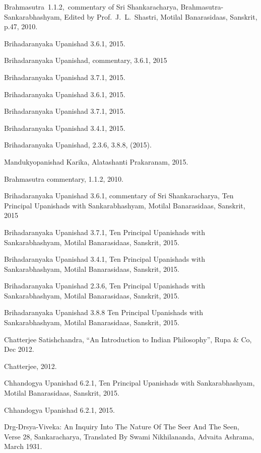 \documentclass[twoside, 13pt]{article}
\begin{document}
{{{\begin{thebibliography}{99}

\bibitem{} Brahmasutra~1.1.2,~commentary of Sri Shankaracharya, Brahmasutra-Sankarabha\break shyam, Edited by Prof.~J.~L.~Shastri, Motilal Banarasidaas, Sanskrit, p.47, 2010.

\bibitem{} Brihadaranyaka Upanishad 3.6.1, 2015.

\bibitem{} Brihadaranyaka Upanishad, commentary, 3.6.1, 2015

\bibitem{} Brihadaranyaka Upanishad 3.7.1, 2015.

\bibitem{} Brihadaranyaka Upanishad 3.6.1, 2015.

\bibitem{} Brihadaranyaka Upanishad 3.7.1, 2015.

\bibitem{} Brihadaranyaka Upanishad 3.4.1, 2015.

\bibitem{} Brihadaranyaka Upanishad, 2.3.6, 3.8.8, (2015).

\bibitem{} Mandukyopanishad Karika, Alatashanti Prakaranam, 2015.

\bibitem{} Brahmasutra commentary, 1.1.2, 2010.

\bibitem{} Brihadaranyaka Upanishad 3.6.1, commentary of Sri Shankaracharya, Ten Principal Upanishads with Sankarabhashyam, Motilal Banarasidaas, Sanskrit, 2015

\bibitem{}Brihadaranyaka Upanishad 3.7.1, Ten Principal Upanishads with Sankarabhashyam, Motilal Banarasidaas, Sanskrit, 2015.

\bibitem{} Brihadaranyaka Upanishad 3.4.1, Ten Principal Upanishads with Sankarabhashyam, Motilal Banarasidaas, Sanskrit, 2015.

\bibitem{} Brihadaranyaka Upanishad 2.3.6, Ten Principal Upanishads with Sankarabhashyam, Motilal Banarasidaas, Sanskrit, 2015.

\bibitem{} Brihadaranyaka Upanishad 3.8.8 Ten Principal Upanishads with Sankarabhashyam, Motilal Banarasidaas, Sanskrit, 2015.

\bibitem{} Chatterjee Satishchandra, “An Introduction to Indian Philosophy”, Rupa \& Co, Dec 2012.

\bibitem{} Chatterjee, 2012.

\bibitem{} Chhandogya Upanishad 6.2.1, Ten Principal Upanishads with Sankarabhashyam, Motilal Banarasidaas, Sanskrit, 2015.

\bibitem{} Chhandogya Upanishad 6.2.1, 2015.

\bibitem{} Drg-Drsya-Viveka: An Inquiry Into The Nature Of The Seer And The Seen, Verse 28, Sankaracharya, Translated By Swami Nikhilananda, Advaita Ashrama, March 1931.


\end{thebibliography}}}}
\end{document}
